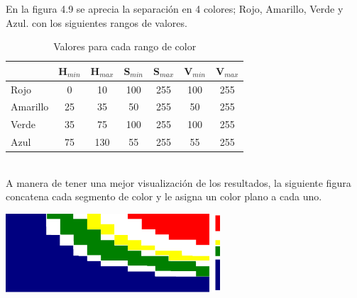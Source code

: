 En la figura 4.9 se aprecia la separación en 4 colores; Rojo, Amarillo, Verde y Azul.
con los siguientes rangos de valores.\\
\begin{table}[ht]
	\begin{center}
		\caption{Valores para cada rango de color}
		\begin{tabular}[t]{lcccccc}
			\hline
			         & H$_{min}$ & H$_{max}$ & S$_{min}$ & S$_{max}$ & V$_{min}$ & V$_{max}$ \\
			\hline
			Rojo     & 0         & 10        & 100       & 255       & 100       & 255       \\
			Amarillo & 25        & 35        & 50        & 255       & 50        & 255       \\
			Verde    & 35        & 75        & 100       & 255       & 100       & 255       \\
			Azul     & 75        & 130       & 55        & 255       & 55        & 255       \\
			\hline
		\end{tabular}
	\end{center}
\end{table}\\
A manera de tener una mejor visualización de los resultados, la siguiente figura concatena
cada segmento de color y le asigna un color plano a cada uno.
\begin{center}
	\includegraphics[width=0.6\textwidth]{Contenido/Cuerpo/Capitulo4/Fig6.eps}
	\label{Fig6}
\end{center}

